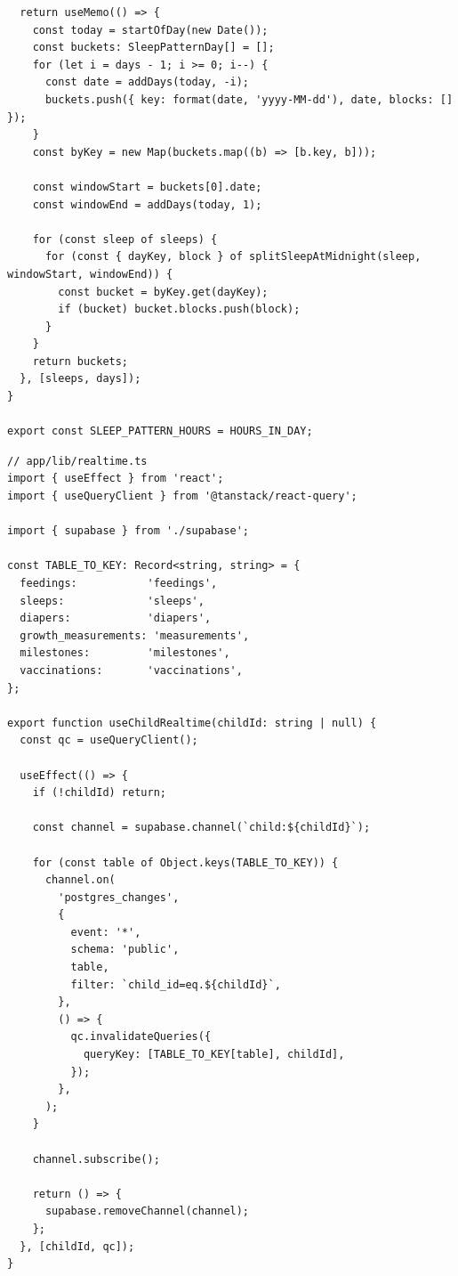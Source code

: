 \documentclass[%
  ukrainian, utf8, columnvii, simple,
  hpadding=10mm, vpadding=10mm, reduceheight=2mm,
  floatsection,
]{eskdtext}
\begin{document}
{\begin{verbatim}
  return useMemo(() => {
    const today = startOfDay(new Date());
    const buckets: SleepPatternDay[] = [];
    for (let i = days - 1; i >= 0; i--) {
      const date = addDays(today, -i);
      buckets.push({ key: format(date, 'yyyy-MM-dd'), date, blocks: [] });
    }
    const byKey = new Map(buckets.map((b) => [b.key, b]));

    const windowStart = buckets[0].date;
    const windowEnd = addDays(today, 1);

    for (const sleep of sleeps) {
      for (const { dayKey, block } of splitSleepAtMidnight(sleep, windowStart, windowEnd)) {
        const bucket = byKey.get(dayKey);
        if (bucket) bucket.blocks.push(block);
      }
    }
    return buckets;
  }, [sleeps, days]);
}

export const SLEEP_PATTERN_HOURS = HOURS_IN_DAY;
\end{verbatim}

\begin{verbatim}
// app/lib/realtime.ts
import { useEffect } from 'react';
import { useQueryClient } from '@tanstack/react-query';

import { supabase } from './supabase';

const TABLE_TO_KEY: Record<string, string> = {
  feedings:           'feedings',
  sleeps:             'sleeps',
  diapers:            'diapers',
  growth_measurements: 'measurements',
  milestones:         'milestones',
  vaccinations:       'vaccinations',
};

export function useChildRealtime(childId: string | null) {
  const qc = useQueryClient();

  useEffect(() => {
    if (!childId) return;

    const channel = supabase.channel(`child:${childId}`);

    for (const table of Object.keys(TABLE_TO_KEY)) {
      channel.on(
        'postgres_changes',
        {
          event: '*',
          schema: 'public',
          table,
          filter: `child_id=eq.${childId}`,
        },
        () => {
          qc.invalidateQueries({
            queryKey: [TABLE_TO_KEY[table], childId],
          });
        },
      );
    }

    channel.subscribe();

    return () => {
      supabase.removeChannel(channel);
    };
  }, [childId, qc]);
}
\end{verbatim}

}
\end{document}
